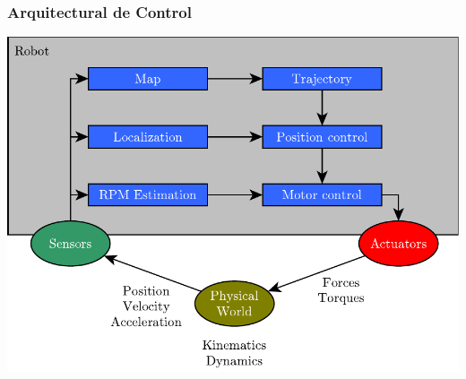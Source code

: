 \begin{frame}
    \frametitle{Arquitectural de Control}
    
    \begin{center}
        \includegraphics[width=0.7\columnwidth]{./images/control_architecture.pdf}
    \end{center}
    
\end{frame}
